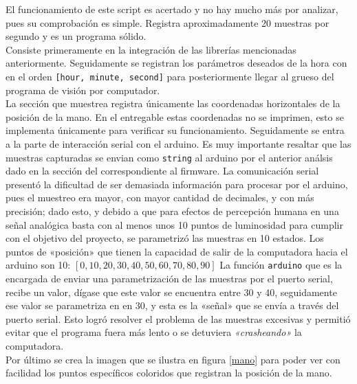 El funcionamiento de este script es acertado y no hay mucho más por analizar, pues su comprobación es simple. Registra aproximadamente 20 muestras por segundo y es un programa sólido.\\
Consiste primeramente en la integración de las librerías mencionadas anteriormente. Seguidamente se registran los parámetros deseados de la hora con en el orden \texttt{[hour, minute, second]} para posteriormente llegar al grueso del programa de visión por computador.\\
La sección que muestrea registra únicamente las coordenadas horizontales de la posición de la mano. En el entregable estas coordenadas no se imprimen, esto se implementa únicamente para verificar su funcionamiento. Seguidamente se entra a la parte de interacción serial con el arduino. Es muy importante resaltar que las muestras capturadas se envian como \texttt{string} al arduino por el anterior análsis dado en la sección del correspondiente al firmware. La comunicación serial presentó la dificultad de ser demasiada información para procesar por el arduino, pues el muestreo era mayor, con mayor cantidad de decimales, y con más precisión; dado esto, y debido a que para efectos de percepción humana en una señal analógica basta con al menos unos 10 puntos de luminosidad para cumplir con el objetivo del proyecto, se parametrizó las muestras en 10 estados. Los puntos de «posición» que tienen la capacidad de salir de la computadora hacia el arduino son 10: $[0, 10, 20, 30, 40, 50, 60, 70, 80, 90]$ La función \texttt{arduino} que es la encargada de enviar una parametrización de las muestras por el puerto serial, recibe un valor, dígase que este valor se encuentra entre 30 y 40, seguidamente ese valor se parametriza en en 30, y esta es la «señal» que se envía a través del puerto serial. Esto logró resolver el problema de las muestras excesivas y permitió evitar que el programa fuera más lento o se detuviera \textit{«crasheando»} la computadora.\\
Por último se crea la imagen que se ilustra en figura \ref{mano} para poder ver con facilidad los puntos específicos coloridos que registran la posición de la mano.